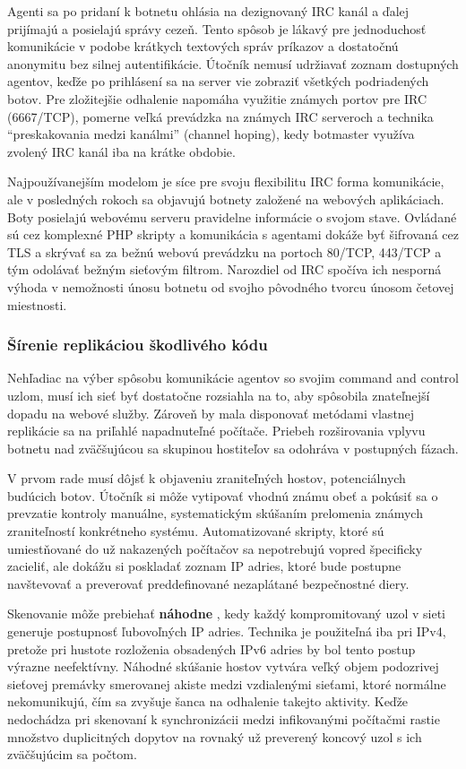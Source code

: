 \documentclass[12pt, a4paper]{article}
\begin{document}
Agenti sa po pridaní k botnetu ohlásia na dezignovaný IRC kanál a ďalej prijímajú a posielajú správy 
cezeň. Tento spôsob je lákavý pre jednoduchosť komunikácie v podobe krátkych textových správ príkazov a 
dostatočnú anonymitu bez silnej autentifikácie. Útočník nemusí udržiavať zoznam dostupných agentov, keďže po 
prihlásení sa na server vie zobraziť všetkých podriadených botov. Pre zložitejšie odhalenie napomáha 
využitie známych portov pre IRC (6667/TCP), pomerne veľká prevádzka na známych IRC serveroch a technika 
\enquote{preskakovania medzi kanálmi} (channel hoping), kedy botmaster využíva zvolený IRC kanál iba na 
krátke obdobie.

Najpoužívanejším modelom je síce pre svoju flexibilitu IRC forma komunikácie, ale v posledných rokoch sa 
objavujú botnety založené na webových aplikáciach. Boty posielajú webovému serveru pravidelne informácie o 
svojom stave. Ovládané sú cez komplexné PHP skripty a komunikácia s agentami dokáže byť šifrovaná cez TLS a 
skrývať sa za bežnú webovú prevádzku na portoch 80/TCP, 443/TCP a tým odolávať bežným sieťovým filtrom. 
Narozdiel od IRC spočíva ich nesporná výhoda v nemožnosti únosu botnetu od svojho pôvodného tvorcu únosom 
četovej miestnosti.

\subsubsection{Šírenie replikáciou škodlivého kódu}
Nehľadiac na výber spôsobu komunikácie agentov so svojim command and control uzlom, musí ich sieť byť 
dostatočne rozsiahla na to, aby spôsobila znateľnejší dopadu na webové služby. Zároveň by mala disponovať 
metódami vlastnej replikácie sa na priľahlé napadnuteľné počítače. Priebeh rozširovania vplyvu botnetu
nad zväčšujúcou sa skupinou hostiteľov sa odohráva v postupných fázach. 

V prvom rade musí dôjsť k objaveniu zraniteľných hostov, potenciálnych budúcich botov. Útočník si
môže vytipovať vhodnú známu obeť a pokúsiť sa o prevzatie kontroly manuálne, systematickým skúšaním
prelomenia známych zraniteľností konkrétneho systému. Automatizované skripty, ktoré sú umiestňované do už 
nakazených počítačov sa nepotrebujú vopred špecificky zacieliť, ale dokážu si poskladať zoznam IP adries, 
ktoré bude postupne navštevovať a preverovať preddefinované nezaplátané bezpečnostné diery. 

Skenovanie môže prebiehať \textbf{náhodne} \cite{ddos-anatomy-2004}, kedy každý kompromitovaný uzol v sieti 
generuje postupnosť ľubovoľných IP adries. Technika je použiteľná iba pri IPv4, pretože pri hustote 
rozloženia obsadených IPv6 adries by bol tento postup výrazne neefektívny. Náhodné skúšanie hostov
vytvára veľký objem podozrivej sieťovej premávky smerovanej akiste medzi vzdialenými sieťami, 
ktoré normálne nekomunikujú, čím sa zvyšuje šanca na odhalenie takejto aktivity. Keďže nedochádza 
pri skenovaní k synchronizácii medzi infikovanými počítačmi rastie množstvo duplicitných dopytov
na rovnaký už preverený koncový uzol s ich zväčšujúcim sa počtom.
\end{document}
